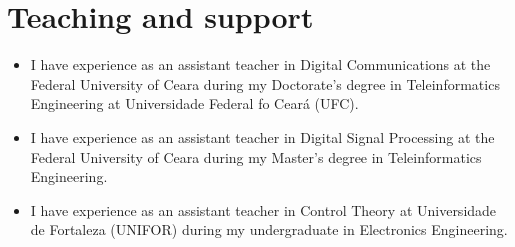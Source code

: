 \section{Teaching and support}
\begin{itemize}[leftmargin=0.15in, label={}] %
    \item I have experience as an assistant teacher in Digital Communications at the Federal University of Ceara during my Doctorate's degree in Teleinformatics Engineering at Universidade Federal fo Cear\'{a} (UFC). 
    \item I have experience as an assistant teacher in Digital Signal Processing at the Federal University of Ceara during my Master's degree in Teleinformatics Engineering. 
    \item I have experience as an assistant teacher in Control Theory at Universidade de Fortaleza (UNIFOR) during my undergraduate in Electronics Engineering.
\end{itemize}
